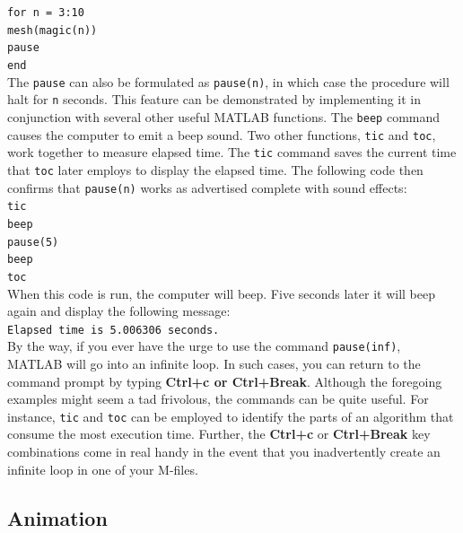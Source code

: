 \documentclass[../main.tex]{subfiles}
\begin{document}
\texttt{for n = 3:10\\
\indent\hspace{2mm} mesh(magic(n))\\
\indent\hspace{2mm} pause\\
\indent end}\\

The \texttt{pause} can also be formulated as \texttt{pause(n)}, in which case the procedure will halt
for \texttt{n} seconds. This feature can be demonstrated by implementing it in conjunction with
several other useful MATLAB functions. The \texttt{beep} command causes the computer to emit
a beep sound. Two other functions, \texttt{tic} and \texttt{toc}, work together to measure elapsed time.
The \texttt{tic} command saves the current time that \texttt{toc} later employs to display the elapsed
time. The following code then confirms that \texttt{pause(n)} works as advertised complete with
sound effects:\\

\texttt{tic\\
\indent beep\\
\indent pause(5)\\
\indent beep\\
\indent toc}\\

\noindent When this code is run, the computer will beep. Five seconds later it will beep again and display
the following message:\\

\texttt{Elapsed time is 5.006306 seconds.}\\

\noindent By the way, if you ever have the urge to use the command \texttt{pause(inf)}, MATLAB will go
into an infinite loop. In such cases, you can return to the command prompt by typing
\textbf{Ctrl+c or Ctrl+Break}.
Although the foregoing examples might seem a tad frivolous, the commands can be
quite useful. For instance, \texttt{tic} and \texttt{toc} can be employed to identify the parts of an algorithm
that consume the most execution time. Further, the \textbf{Ctrl+c} or \textbf{Ctrl+Break} key combinations
come in real handy in the event that you inadvertently create an infinite loop in
one of your M-files.\\

\subsection{Animation}
\end{document}
